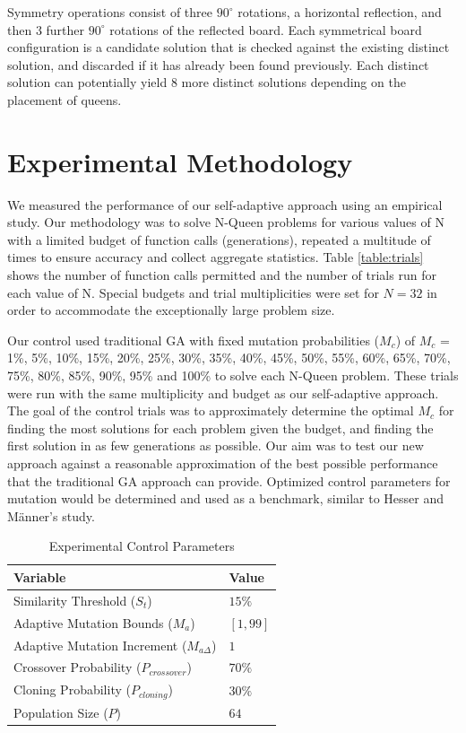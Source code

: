 \documentclass[conference]{IEEEtran}
\begin{document}
Symmetry operations consist of three $90^{\circ}$ rotations, a horizontal reflection, and then 3 further $90^{\circ}$ rotations of the reflected board. Each symmetrical board configuration is a candidate solution that is checked against the existing distinct solution, and discarded if it has already been found previously. Each distinct solution can potentially yield 8 more distinct solutions depending on the placement of queens.

\section{Experimental Methodology}
We measured the performance of our self-adaptive approach using an empirical study. Our methodology was to solve N-Queen problems for various values of N with a limited budget of function calls (generations), repeated a multitude of times to ensure accuracy and collect aggregate statistics. Table \ref{table:trials} shows the number of function calls permitted and the number of trials run for each value of N. Special budgets and trial multiplicities were set for $N = 32$ in order to accommodate the exceptionally large problem size.

Our control used traditional GA with fixed mutation probabilities ($M_{c}$) of $M_{c}$ = 1\%, 5\%, 10\%, 15\%, 20\%, 25\%, 30\%, 35\%, 40\%, 45\%, 50\%, 55\%, 60\%, 65\%, 70\%, 75\%, 80\%, 85\%, 90\%, 95\% and 100\% to solve each N-Queen problem. These trials were run with the same multiplicity and budget as our self-adaptive approach. The goal of the control trials was to approximately determine the optimal $M_{c}$ for finding the most solutions for each problem given the budget, and finding the first solution in as few generations as possible. Our aim was to test our new approach against a reasonable approximation of the best possible performance that the traditional GA approach can provide. Optimized control parameters for mutation would be determined and used as a benchmark, similar to Hesser and M\"{a}nner's study.


\begin{table}\label{table:geneticoperators}
\centering
\caption{Experimental Control Parameters}
\begin{tabular}{|l|l|} \hline
Variable&                                     Value \\ \hline
Similarity Threshold ($S_{t}$)&               $15\%$ \\ \hline
Adaptive Mutation Bounds ($M_{a}$)&           $[1, 99]$ \\ \hline   
Adaptive Mutation Increment ($M_{a\Delta}$)&  $1$ \\ \hline
Crossover Probability ($P_{crossover}$)&      $70\%$ \\ \hline
Cloning Probability ($P_{cloning}$)&          $30\%$ \\ \hline
Population Size ($P$)&                        $64$ \\ \hline      
\end{tabular}
\label{table:variables}
\end{table}
\end{document}
